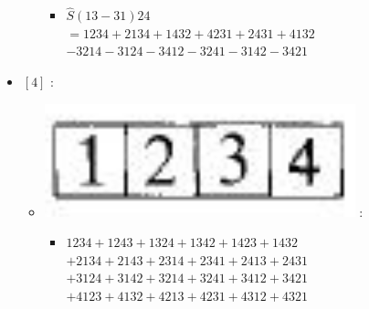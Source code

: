 \documentclass[12pt,a4paper]{article}
\newcommand{\h}[2]{\color{#1} #2 \color{black} }
\newcommand{\equalInM}[1]{\h{blue}{#1}} %
\begin{document}
\begin{itemize}
\begin{itemize}
\begin{itemize}
\item $ \hat{S} \left(13 -31 \right)24$\\
  $= 1234 + 2134 + 1432 + 4231 + 2431 + 4132$  \\
  $ - 3214 - 3124 - 3412 - 3241 - 3142 - 3421$ 
\end{itemize}
\end{itemize}
\item $\left[ 4\right]$ :
\begin{itemize}
\item \includegraphics[scale=0.2]{build/young-4.png} : 
\begin{itemize}[label=$\ast$]
 \item \equalInM{$1234 + 1243 + 1324 + 1342 + 1423 + 1432  $\\
 $ + 2134 + 2143 + 2314 + 2341 + 2413+2431$ \\
 $ + 3124 + 3142 + 3214 + 3241 + 3412 + 3421 $\\
 $ + 4123 + 4132 + 4213 + 4231 + 4312 + 4321 $}
\end{itemize}
\end{itemize}
\end{itemize}








 \newpage
\end{document}
